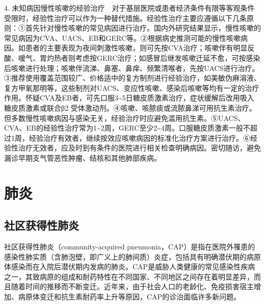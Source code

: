 4.
未知病因慢性咳嗽的经验治疗　对于基层医院或患者经济条件有限等客观条件受限时，经验性治疗可以作为一种替代措施。经验性治疗主要应遵循以下几条原则：①首先针对慢性咳嗽的常见病因进行治疗。国内外研究结果显示，慢性咳嗽的常见病因为CVA、UACS、EB和GERC等。②根据病史推测可能的慢性咳嗽病因。如患者的主要表现为夜间刺激性咳嗽，则可先按CVA治疗；咳嗽伴有明显反酸、嗳气、胃灼热者则考虑按GERC治疗；如感冒后继发咳嗽迁延不愈，可按感染后咳嗽进行处理；咳嗽伴流涕、鼻塞、鼻痒、频繁清喉者，先按UACS进行治疗。③推荐使用覆盖范围较广、价格适中的复方制剂进行经验治疗，如美敏伪麻溶液、复方甲氧那明等，这些制剂对UACS、变应性咳嗽、感染后咳嗽等均有一定的治疗作用。怀疑CVA及EB者，可先口服3\textasciitilde{}5日糖皮质激素治疗，症状缓解后改用吸入糖皮质激素或联合β{2}
受体激动剂。④咳嗽、咳脓痰或流脓鼻涕可用抗生素治疗。但多数慢性咳嗽病因与感染无关，经验治疗时应避免滥用抗生素。⑤UACS、CVA、EB的经验性治疗常为1\textasciitilde{}2周，GERC至少2\textasciitilde{}4周。口服糖皮质激素一般不超过1周，经验治疗有效者，继续按效应咳嗽病因的标准化治疗方案进行治疗。⑥经验性治疗无效者，应及时到有条件的医院进行相关检查明确病因。密切随访，避免漏诊早期支气管恶性肿瘤、结核和其他肺部疾病。

\section{肺炎}

\subsection{社区获得性肺炎}

社区获得性肺炎（community-acquired
pneumonia，CAP）是指在医院外罹患的感染性肺实质（含肺泡壁，即广义上的肺间质）炎症，包括具有明确潜伏期的病原体感染而在入院后潜伏期内发病的肺炎。CAP是威胁人类健康的常见感染性疾病之一，其致病原的组成和耐药特性在不同国家、不同地区之间存在着明显差异，而且随着时间的推移而不断变迁。近年来，由于社会人口的老龄化、免疫损害宿主增加、病原体变迁和抗生素耐药率上升等原因，CAP的诊治面临许多新问题。

